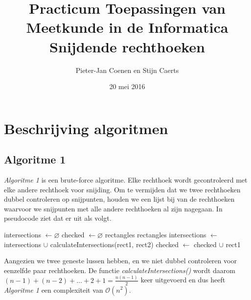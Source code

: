 \documentclass[11pt,a4paper,titlepage]{article}
\author{Pieter-Jan Coenen en Stijn Caerts}
\title{Practicum Toepassingen van Meetkunde in de Informatica \\ Snijdende rechthoeken}
\date{20 mei 2016}
\begin{document}
	\maketitle
	\tableofcontents
	\newpage
	\section{Beschrijving algoritmen}
	\subsection{Algoritme 1}
	\emph{Algoritme 1} is een brute-force algoritme. Elke rechthoek wordt gecontroleerd met elke andere rechthoek voor snijding. Om te vermijden dat we twee rechthoeken dubbel controleren op snijpunten, houden we een lijst bij van de rechthoeken waarvoor we snijpunten met alle andere rechthoeken al zijn nagegaan. In pseudocode ziet dat er uit als volgt.
	\begin{algorithm}[H]
		\caption{}
		\begin{algorithmic}[1]
			\State intersections $\gets \varnothing $
			\State checked $\gets \varnothing $
			 {rectangles}
				 {rectangles}
						\State intersections $ \gets $ intersections $ \cup $ calculateIntersections(rect1, rect2)
					\EndIf
				\EndForEach
				\State checked $\gets$ checked $\cup$ rect1
			\EndForEach
		\end{algorithmic}
	\end{algorithm}
	Aangezien we twee geneste lussen hebben, en we niet dubbel controleren voor eenzelfde paar rechthoeken. De functie \emph{calculateIntersections()} wordt daarom $ (n-1) + (n-2) + \dots + 2 + 1 = \frac{n(n-1)}{2} $ keer uitgevoerd en dus heeft \emph{Algoritme 1} een complexiteit van $\mathcal{O}(n^2)$.
	
\end{document}
